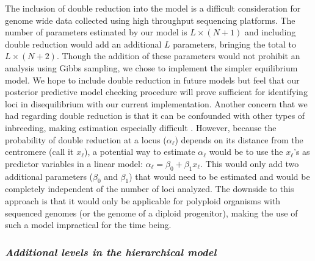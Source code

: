 \documentclass[11pt,english,letterpaper,oneside]{article}
\begin{document}
The inclusion of double reduction into the model is a difficult consideration for genome wide data collected using high throughput sequencing platforms. The number of parameters estimated by our model is $L\times(N+1)$ and including double reduction would add an additional $L$ parameters, bringing the total to $L\times(N+2)$. Though the addition of these parameters would not prohibit an analysis using Gibbs sampling, we chose to implement the simpler equilibrium model. We hope to include double reduction in future models but feel that our posterior predictive model checking procedure will prove sufficient for identifying loci in disequilibrium with our current implementation. Another concern that we had regarding double reduction is that it can be confounded with other types of inbreeding, making estimation especially difficult \citep{hardy2015autopolyploids}. However, because the probability of double reduction at a locus ($\alpha_\ell$) depends on its distance from the centromere (call it $x_\ell$), a potential way to estimate $\alpha_\ell$ would be to use the $x_\ell$'s as predictor variables in a linear model: $\alpha_{\ell} = \beta_0 + \beta_1 x_{\ell}$. This would only add two additional parameters ($\beta_0$ and $\beta_1$) that would need to be estimated and would be completely independent of the number of loci analyzed. The downside to this approach is that it would only be applicable for polyploid organisms with sequenced genomes (or the genome of a diploid progenitor), making the use of such a model impractical for the time being.

\subsubsection{{\itshape Additional levels in the hierarchical model}}
\medskip
\end{document}
